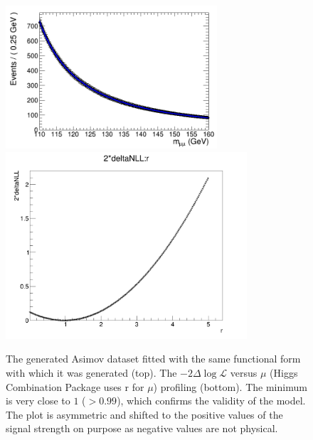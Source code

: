 \begin{figure}[htbp]
     \centering
     \includegraphics[width=0.7\textwidth]{figures/combine/asimovTests/cat6_x_fit_b.png}\\
     \includegraphics[width=0.8\textwidth]{figures/combine/asimovTests/NLL_asimovTest_p25GeV.png}
     \caption{The generated Asimov dataset fitted with the same functional form with which it was generated (top). The $-2\Delta\log{\mathcal{L}}$ versus $\mu$ (Higgs Combination Package uses r for $\mu$) profiling (bottom). The minimum is very close to $1$ ($> 0.99$), which confirms the validity of the model. The plot is asymmetric and shifted to the positive values of the signal strength on purpose as negative values are not physical.}
     \label{fig:higgs_combination_asimovtests}
 \end{figure}


